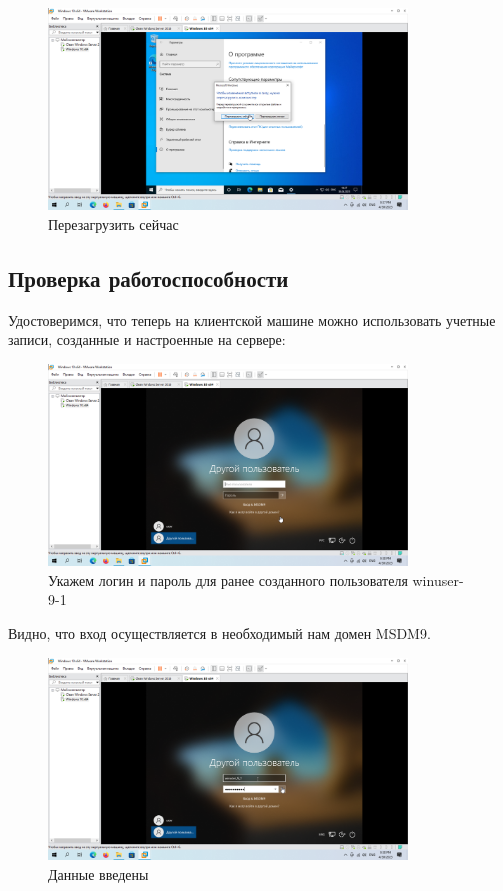 \documentclass[a4paper]{article}
\begin{document}
  \begin{figure}[H]
    \centering
    \includegraphics[width=0.85\textwidth]{Screenshot_109}
    \caption{Перезагрузить сейчас}
    \label{img:109}
  \end{figure}

  \subsection{Проверка работоспособности}

  Удостоверимся, что теперь на клиентской машине можно использовать учетные записи,
  созданные и настроенные на сервере:

  \begin{figure}[H]
    \centering
    \includegraphics[width=0.85\textwidth]{Screenshot_110}
    \caption{Укажем логин и пароль для ранее созданного пользователя winuser-9-1}
    \label{img:110}
  \end{figure}

  Видно, что вход осуществляется в необходимый нам домен MSDM9.

  \begin{figure}[H]
    \centering
    \includegraphics[width=0.85\textwidth]{Screenshot_111}
    \caption{Данные введены}
    \label{img:111}
  \end{figure}
\end{document}
